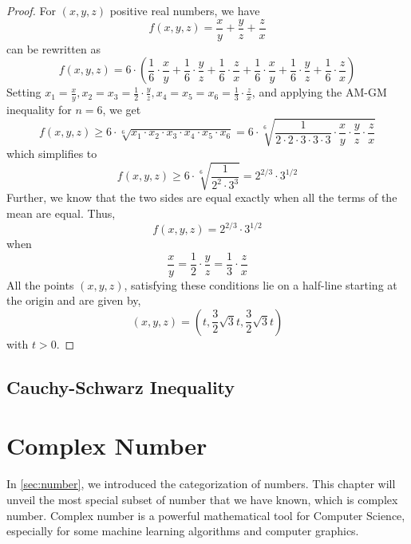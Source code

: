 \documentclass[
	12pt, %
	fleqn, %
	a4paper, %
]{LegrandOrangeBook}
\begin{document}
    \begin{proof}
    For \( (x, y, z) \) positive real numbers, we have
    \[
    f(x, y, z) = \frac{x}{y} + \frac{y}{z} + \frac{z}{x}
    \]
    can be rewritten as
    \[
    f(x, y, z) = 6 \cdot \left( \frac{1}{6} \cdot \frac{x}{y} + \frac{1}{6} \cdot \frac{y}{z} + \frac{1}{6} \cdot \frac{z}{x} + \frac{1}{6} \cdot \frac{x}{y} + \frac{1}{6} \cdot \frac{y}{z} + \frac{1}{6} \cdot \frac{z}{x} \right)
    \]
    Setting \( x_1 = \frac{x}{y}, x_2 = x_3 = \frac{1}{2} \cdot \frac{y}{z}, x_4 = x_5 = x_6 = \frac{1}{3} \cdot \frac{z}{x} \), and applying the AM-GM inequality for \( n = 6 \), we get
    \[
    f(x, y, z) \geq 6 \cdot \sqrt[6]{x_1 \cdot x_2 \cdot x_3 \cdot x_4 \cdot x_5 \cdot x_6} = 6 \cdot \sqrt[6]{\frac{1}{2 \cdot 2 \cdot 3 \cdot 3 \cdot 3} \cdot \frac{x}{y} \cdot \frac{y}{z} \cdot \frac{z}{x}}
    \]
    which simplifies to
    \[
    f(x, y, z) \geq 6 \cdot \sqrt[6]{\frac{1}{2^2 \cdot 3^3}} = 2^{2/3} \cdot 3^{1/2}
    \]
    Further, we know that the two sides are equal exactly when all the terms of the mean are equal. Thus,
    \[
    f(x, y, z) = 2^{2/3} \cdot 3^{1/2}
    \]
    when
    \[
    \frac{x}{y} = \frac{1}{2} \cdot \frac{y}{z} = \frac{1}{3} \cdot \frac{z}{x}
    \]
    All the points \( (x, y, z) \), satisfying these conditions lie on a half-line starting at the origin and are given by,
    \[
    (x, y, z) = \left( t, \frac{3}{2}\sqrt{3}t, \frac{3}{2}\sqrt{3}t \right)
    \]
    with \( t > 0 \).
    \end{proof}
    
\section{Cauchy-Schwarz Inequality}



\chapterspaceabove{6.75cm} 
\chapterspacebelow{7.25cm} 
\chapter{Complex Number}
In \autoref{sec:number}, we introduced the categorization of numbers. This chapter will unveil the
most special subset of number that we have known, which is complex number. Complex number is a powerful
mathematical tool for Computer Science, especially for some machine learning algorithms and computer graphics.
\end{document}
